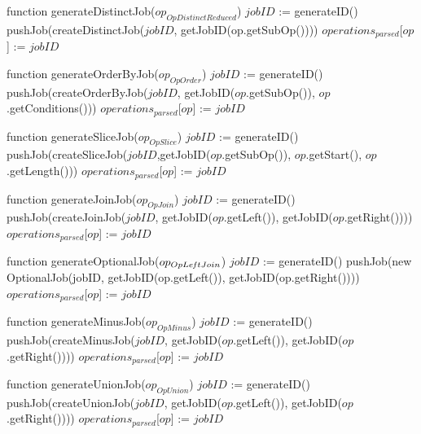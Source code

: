 function generateDistinctJob($op_{OpDistinctReduced}$) 
    $jobID$ := generateID()
    pushJob(createDistinctJob($jobID$, getJobID(op.getSubOp())))
    $operations_{parsed}$[$op$] := $jobID$

function generateOrderByJob($op_{OpOrder}$) 
    $jobID$ := generateID()
    pushJob(createOrderByJob($jobID$, getJobID($op$.getSubOp()), $op$.getConditions()))
    $operations_{parsed}$[$op$] := $jobID$

function generateSliceJob($op_{OpSlice}$) 
    $jobID$ := generateID()
    pushJob(createSliceJob($jobID$,getJobID($op$.getSubOp()), $op$.getStart(), $op$.getLength()))
    $operations_{parsed}$[$op$] := $jobID$

function generateJoinJob($op_{OpJoin}$) 
    $jobID$ := generateID()
    pushJob(createJoinJob($jobID$, getJobID($op$.getLeft()), getJobID($op$.getRight())))
    $operations_{parsed}$[$op$] := $jobID$

function generateOptionalJob($op_{OpLe\textrm{\emph{f}}tJoin}$) 
    $jobID$ := generateID()
    pushJob(new OptionalJob(jobID, getJobID(op.getLeft()), getJobID(op.getRight())))
    $operations_{parsed}$[$op$] := $jobID$

function generateMinusJob($op_{OpMinus}$) 
    $jobID$ := generateID()
    pushJob(createMinusJob($jobID$, getJobID($op$.getLeft()), getJobID($op$.getRight())))
    $operations_{parsed}$[$op$] := $jobID$

function generateUnionJob($op_{OpUnion}$) 
    $jobID$ := generateID()
    pushJob(createUnionJob($jobID$, getJobID($op$.getLeft()), getJobID($op$.getRight())))
    $operations_{parsed}$[$op$] := $jobID$




